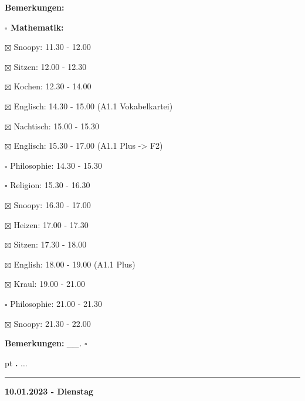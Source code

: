 \documentclass[10pt,a4paper]{article}
\newcounter{notec}
\newcommand\notep[1]{%
  \stepcounter{notec}
  \vskip #1pt
  {\bf\arabic{notec}.}
}
\newcommand\prop[1] {{\color {alizarin} {\bf #1}}}             %
\newcommand\draf[1] {{\color {amber(sae/ece)} {\bf #1}}}       %
\newcommand\rele[1] {{\color {english} \bf {#1}}}              %
\newcommand\mand[1] {{\color {burntorange} {\bf #1}}}          %
\newcommand\ddivide {\vskip -9pt \hrule \vskip 6pt}
\newcommand\bottomspace{\vskip 4pt}
\newcommand\n[1] { {\sl #1.} \hskip 5pt }
\begin{document}
\begin{mdframed}[style=daystyle]
\begin{labeling}{{\mand {Bemerkungen:}}}
\begin{minipage}{0.75\textwidth}
\begin{labeling}{\prop {$\square$ {Mathematik:}}}
      \item[$\boxtimes$ Snoopy:]      11.30 - 12.00
      \item[$\boxtimes$ Sitzen:]      12.00 - 12.30
      \item[$\boxtimes$ Kochen:]      12.30 - 14.00
      \item[$\boxtimes$ Englisch:]    14.30 - 15.00 (A1.1 Vokabelkartei)
      \item[$\boxtimes$ Nachtisch:]   15.00 - 15.30
      \item[$\boxtimes$ Englisch:]    15.30 - 17.00 (A1.1 Plus -> F2)
      \item[$\square$ Philosophie:] 14.30 - 15.30
      \item[$\square$ Religion:]    15.30 - 16.30
        
      \item[$\boxtimes$ Snoopy:]      16.30 - 17.00
      \item[$\boxtimes$ Heizen:]      17.00 - 17.30
      \item[$\boxtimes$ Sitzen:]      17.30 - 18.00
      \item[$\boxtimes$ English:]     18.00 - 19.00 (A1.1 Plus)
      \item[$\boxtimes$ Kraul:]       19.00 - 21.00
      \item[$\square$ Philosophie:] 21.00 - 21.30
        
      \item[$\boxtimes$ Snoopy:]      21.30 - 22.00
      \end{labeling}
    \end{minipage}
    \bottomspace
  \item[{\mand {Bemerkungen:}}]  \n{\_\_} {\draf {$\square$}}
  \end{labeling}
    
  \setcounter{notec}{0}
  
  \notep 0 $\ldots$

\end{mdframed}


\ddivide
{\rele {10.01.2023 - Dienstag}}
\end{document}
